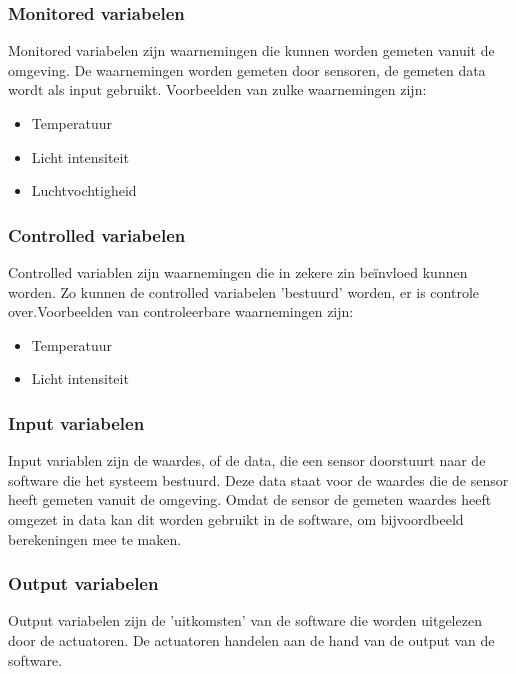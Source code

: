 \documentclass{article}%
\begin{document}
\cite{https://www.researchgate.net/figure/4-Variable-Model-of-Parnas-Madey_fig3_270733268}

\subsubsection{Monitored variabelen}
Monitored variabelen zijn waarnemingen die kunnen worden gemeten vanuit de omgeving. De waarnemingen worden gemeten door sensoren, de gemeten data wordt als input gebruikt. Voorbeelden van zulke waarnemingen zijn:
\begin{itemize}
  \item Temperatuur
  \item Licht intensiteit
  \item Luchtvochtigheid
\end{itemize}

\subsubsection{Controlled variabelen}
Controlled variablen zijn waarnemingen die in zekere zin beïnvloed kunnen worden. Zo kunnen de controlled variabelen 'bestuurd' worden, er is controle over.Voorbeelden van controleerbare waarnemingen zijn:
\begin{itemize}
  \item Temperatuur
  \item Licht intensiteit
\end{itemize}

\subsubsection{Input variabelen}
Input variablen zijn de waardes, of de data, die een sensor doorstuurt naar de software die het systeem bestuurd. Deze data staat voor de waardes die de sensor heeft gemeten vanuit de omgeving. Omdat de sensor de gemeten waardes heeft omgezet in data kan dit worden gebruikt in de software, om bijvoordbeeld berekeningen mee te maken.

\subsubsection{Output variabelen}
Output variabelen zijn de 'uitkomsten' van de software die worden uitgelezen door de actuatoren. De actuatoren handelen aan de hand van de output van de software.
\end{document}
